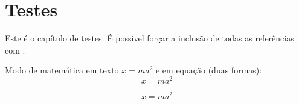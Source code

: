 \chapter{Testes} \label{cap:testes}

Este é o capítulo de testes. 
É possível forçar a inclusão de todas as referências com \cite{*}.

Modo de matemática em texto $x = ma^2$ e em equação (duas formas):
\[
    x = ma^2
\]

\begin{equation}
    x = ma^2
\end{equation}